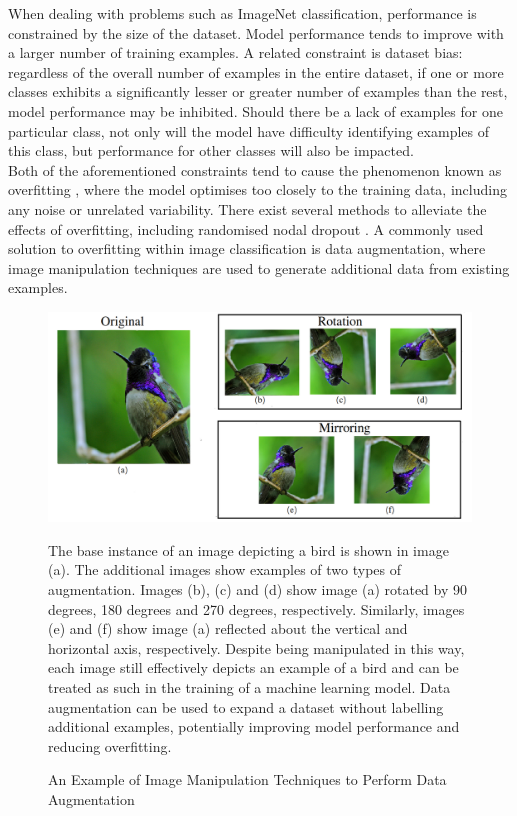 \noindent
When dealing with problems such as ImageNet classification, performance is constrained by the size of the dataset. Model performance tends to improve with a larger number of training examples. A related constraint is dataset bias: regardless of the overall number of examples in the entire dataset, if one or more classes exhibits a significantly lesser or greater number of examples than the rest, model performance may be inhibited. Should there be a lack of examples for one particular class, not only will the model have difficulty identifying examples of this class, but performance for other classes will also be impacted.
\\

\noindent
Both of the aforementioned constraints tend to cause the phenomenon known as overfitting \cite{hawkins2004problem}, where the model optimises too closely to the training data, including any noise or unrelated variability. There exist several methods to alleviate the effects of overfitting, including randomised nodal dropout \cite{srivastava2014dropout}. A commonly used solution to overfitting within image classification is data augmentation, where image manipulation techniques are used to generate additional data from existing examples. 
\\


\begin{figure}[h]
	\centering
	\includegraphics[scale=0.3]{Figures/data_augmentation2.png}
	
	\caption{An Example of Image Manipulation Techniques to Perform Data Augmentation} {The base instance of an image depicting a bird is shown in image (a). The additional images show examples of two types of augmentation. Images (b), (c) and (d) show image (a) rotated by 90 degrees, 180 degrees and 270 degrees, respectively. Similarly, images (e) and (f) show image (a) reflected about the vertical and horizontal axis, respectively. Despite being manipulated in this way, each image still effectively depicts an example of a bird and can be treated as such in the training of a machine learning model. Data augmentation can be used to expand a dataset without labelling additional examples, potentially improving model performance and reducing overfitting.}
	
	\label{fig:data_augmentation}
\end{figure}

